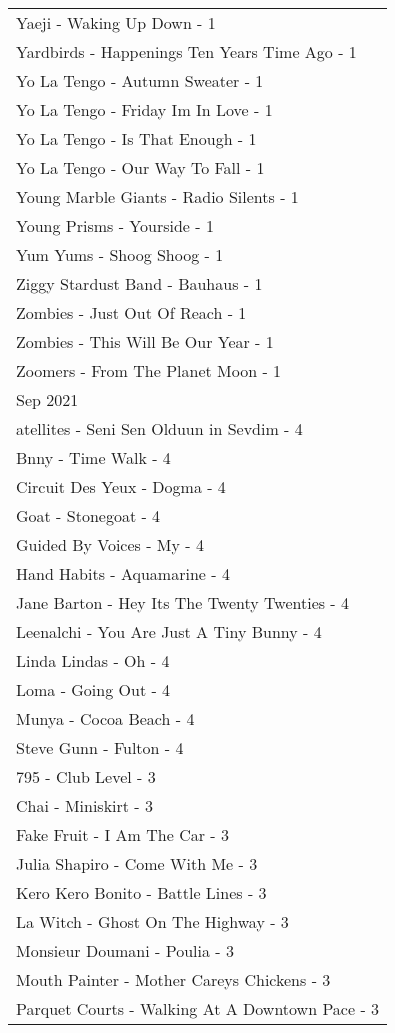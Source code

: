 \documentclass[
]{article}
\begin{document}
\begin{longtable}{l}
Yaeji - Waking Up Down - 1 \\ 
Yardbirds - Happenings Ten Years Time Ago - 1 \\ 
Yo La Tengo - Autumn Sweater - 1 \\ 
Yo La Tengo - Friday Im In Love - 1 \\ 
Yo La Tengo - Is That Enough - 1 \\ 
Yo La Tengo - Our Way To Fall - 1 \\ 
Young Marble Giants - Radio Silents - 1 \\ 
Young Prisms - Yourside - 1 \\ 
Yum Yums - Shoog Shoog - 1 \\ 
Ziggy Stardust Band - Bauhaus - 1 \\ 
Zombies - Just Out Of Reach - 1 \\ 
Zombies - This Will Be Our Year - 1 \\ 
Zoomers - From The Planet Moon - 1 \\ 
\midrule
\multicolumn{1}{l}{Sep 2021} \\ 
\midrule
atellites - Seni Sen Olduun in Sevdim - 4 \\ 
Bnny - Time Walk - 4 \\ 
Circuit Des Yeux - Dogma - 4 \\ 
Goat - Stonegoat - 4 \\ 
Guided By Voices - My - 4 \\ 
Hand Habits - Aquamarine - 4 \\ 
Jane Barton - Hey Its The Twenty Twenties - 4 \\ 
Leenalchi - You Are Just A Tiny Bunny - 4 \\ 
Linda Lindas - Oh - 4 \\ 
Loma - Going Out - 4 \\ 
Munya - Cocoa Beach - 4 \\ 
Steve Gunn - Fulton - 4 \\ 
795 - Club Level - 3 \\ 
Chai - Miniskirt - 3 \\ 
Fake Fruit - I Am The Car - 3 \\ 
Julia Shapiro - Come With Me - 3 \\ 
Kero Kero Bonito - Battle Lines - 3 \\ 
La Witch - Ghost On The Highway - 3 \\ 
Monsieur Doumani - Poulia - 3 \\ 
Mouth Painter - Mother Careys Chickens - 3 \\ 
Parquet Courts - Walking At A Downtown Pace - 3 \\ 

\end{longtable}
\end{document}
